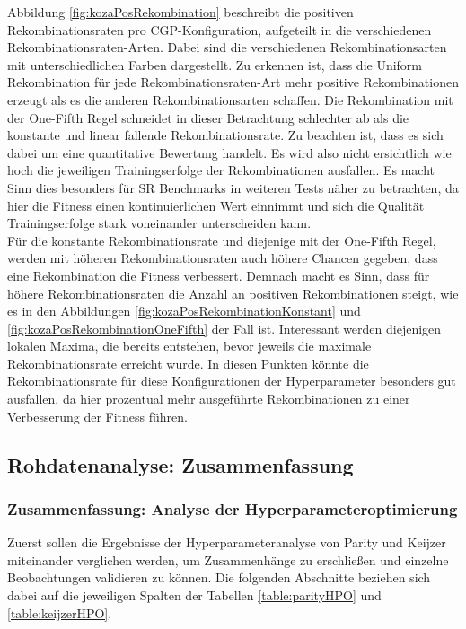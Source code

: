 Abbildung \ref{fig:kozaPosRekombination} beschreibt die positiven Rekombinationsraten pro CGP-Konfiguration, aufgeteilt in die verschiedenen Rekombinationsraten-Arten. 
Dabei sind die verschiedenen Rekombinationsarten mit unterschiedlichen Farben dargestellt.
Zu erkennen ist, dass die Uniform Rekombination für jede Rekombinationsraten-Art mehr positive Rekombinationen erzeugt als es die anderen Rekombinationsarten schaffen.
Die Rekombination mit der One-Fifth Regel schneidet in dieser Betrachtung schlechter ab als die konstante und linear fallende Rekombinationsrate.
Zu beachten ist, dass es sich dabei um eine quantitative Bewertung handelt.
Es wird also nicht ersichtlich wie hoch die jeweiligen Trainingserfolge der Rekombinationen ausfallen.
Es macht Sinn dies besonders für SR Benchmarks in weiteren Tests näher zu betrachten, da hier die Fitness einen kontinuierlichen Wert einnimmt und sich die Qualität Trainingserfolge stark voneinander unterscheiden kann.\\
Für die konstante Rekombinationsrate und diejenige mit der One-Fifth Regel, werden mit höheren Rekombinationsraten auch höhere Chancen gegeben, dass eine Rekombination die Fitness verbessert.
Demnach macht es Sinn, dass für höhere Rekombinationsraten die Anzahl an positiven Rekombinationen steigt, wie es in den Abbildungen \ref{fig:kozaPosRekombinationKonstant} und \ref{fig:kozaPosRekombinationOneFifth} der Fall ist.
Interessant werden diejenigen lokalen Maxima, die bereits entstehen, bevor jeweils die maximale Rekombinationsrate erreicht wurde.
In diesen Punkten könnte die Rekombinationsrate für diese Konfigurationen der Hyperparameter besonders gut ausfallen, da hier prozentual mehr ausgeführte Rekombinationen zu einer Verbesserung der Fitness führen.


\subsection{Rohdatenanalyse: Zusammenfassung}
\label{subsec:rohdatenZusammenfassung}
\subsubsection{Zusammenfassung: Analyse der Hyperparameteroptimierung}
Zuerst sollen die Ergebnisse der Hyperparameteranalyse von Parity und Keijzer miteinander verglichen werden, um Zusammenhänge zu erschließen und einzelne Beobachtungen validieren zu können.
Die folgenden Abschnitte beziehen sich dabei auf die jeweiligen Spalten der Tabellen \ref{table:parityHPO} und \ref{table:keijzerHPO}.
